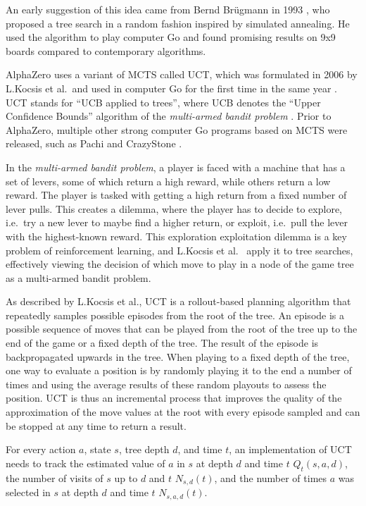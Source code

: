 \documentclass[12pt,onecolumn,oneside,titlepage]{article}
\begin{document}
An early suggestion of this idea came from Bernd Brügmann in 1993 \cite{montecarlogo1993}, who proposed a tree search in a random fashion inspired by simulated annealing. He used the algorithm to play computer Go and found promising results on 9x9 boards compared to contemporary algorithms.

AlphaZero uses a variant of MCTS called UCT, which was formulated in 2006 \cite{kocsis2006bandit} by L.Kocsis et al.\ and used in computer Go for the first time in the same year \cite{gelly2006modification}.
UCT stands for ``UCB applied to trees'', where UCB denotes the ``Upper Confidence Bounds'' algorithm of the \emph{multi-armed bandit problem} \cite{auer2002finite}. 
Prior to AlphaZero, multiple other strong computer Go programs based on MCTS were released, such as Pachi \cite{pachi_github} and CrazyStone \cite{crazystone}.


In the \emph{multi-armed bandit problem}, a player is faced with a machine that has a set of levers, some of which return a high reward, while others return a low reward. The player is tasked with getting a high return from a fixed number of lever pulls.
This creates a dilemma, where the player has to decide to explore, i.e.\ try a new lever to maybe find a higher return, or exploit, i.e.\ pull the lever with the highest-known reward. This exploration exploitation dilemma is a key problem of reinforcement learning,
and L.Kocsis et al.\ \cite{kocsis2006bandit} apply it to tree searches, effectively viewing the decision of which move to play in a node of the game tree as a multi-armed bandit problem.

As described by L.Kocsis et al., UCT is a rollout-based planning algorithm that repeatedly samples possible episodes from the root of the tree.
An episode is a possible sequence of moves that can be played from the root of the tree up to the end of the game or a fixed depth of the tree.
The result of the episode is backpropagated upwards in the tree. When playing to a fixed depth of the tree, one way to evaluate a position is by randomly playing it to the end a number of times and using the average results of these random playouts to assess the position.
UCT is thus an incremental process that improves the quality of the approximation of the move values at the root with every episode sampled and can be stopped at any time to return a result.

For every action $a$, state $s$, tree depth $d$, and time $t$, an implementation of UCT needs to track the estimated value of $a$ in $s$ at depth $d$ and time $t$ $Q_t(s,a,d)$, the number of visits of $s$ up to $d$ and $t$ $N_{s,d}(t)$, and the number of times
$a$ was selected in $s$ at depth $d$ and time $t$ $N_{s,a,d}(t)$.
\end{document}
